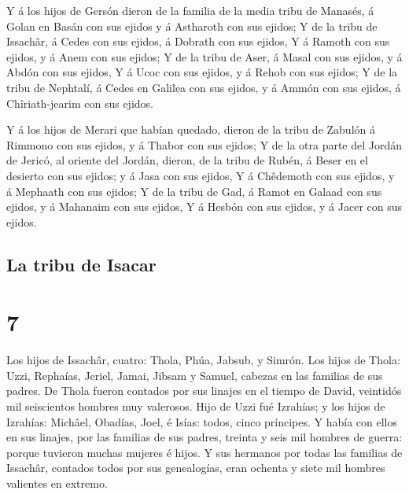  Y á los hijos de Gersón dieron de la familia de la media
tribu de Manasés, á Golan en Basán con sus ejidos y á Astharoth con sus
ejidos;  Y de la tribu de Issachâr, á Cedes con sus
ejidos, á Dobrath con sus ejidos,  Y á Ramoth con sus
ejidos, y á Anem con sus ejidos;  Y de la tribu de Aser,
á Masal con sus ejidos, y á Abdón con sus ejidos,  Y á
Ucoc con sus ejidos, y á Rehob con sus ejidos;  Y de la
tribu de Nephtalí, á Cedes en Galilea con sus ejidos, y á Ammón con sus
ejidos, á Chîriath-jearim con sus ejidos.

 Y á los hijos de Merari que habían quedado, dieron de la
tribu de Zabulón á Rimmono con sus ejidos, y á Thabor con sus ejidos;
 Y de la otra parte del Jordán de Jericó, al oriente del
Jordán, dieron, de la tribu de Rubén, á Beser en el desierto con sus
ejidos; y á Jasa con sus ejidos,  Y á Chêdemoth con sus
ejidos, y á Mephaath con sus ejidos;  Y de la tribu de
Gad, á Ramot en Galaad con sus ejidos, y á Mahanaim con sus ejidos,
 Y á Hesbón con sus ejidos, y á Jacer con sus ejidos.

\hypertarget{la-tribu-de-isacar}{%
\subsection{La tribu de Isacar}\label{la-tribu-de-isacar}}

\hypertarget{section-13-7}{%
\section{7}\label{section-13-7}}

 Los hijos de Issachâr, cuatro: Thola, Phúa, Jabsub, y
Simrón.  Los hijos de Thola: Uzzi, Rephaías, Jeriel,
Jamai, Jibsam y Samuel, cabezas en las familias de sus padres. De Thola
fueron contados por sus linajes en el tiempo de David, veintidós mil
seiscientos hombres muy valerosos.  Hijo de Uzzi fué
Izrahías; y los hijos de Izrahías: Michâel, Obadías, Joel, é Isías:
todos, cinco príncipes.  Y había con ellos en sus linajes,
por las familias de sus padres, treinta y seis mil hombres de guerra:
porque tuvieron muchas mujeres é hijos.  Y sus hermanos
por todas las familias de Issachâr, contados todos por sus genealogías,
eran ochenta y siete mil hombres valientes en extremo.

